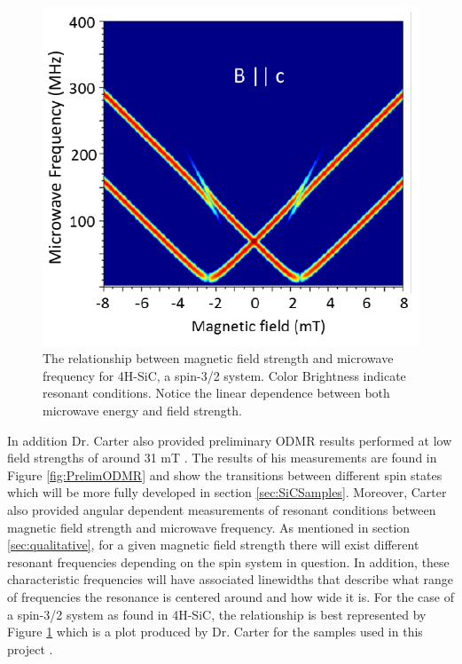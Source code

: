 \documentclass[oneside, noacknowlegments]{BYUPhys}
\begin{document}
\begin{figure}[h]
    \centerline{\includegraphics{MFRelationship_fig}}
    \caption[Magnetic Field and Microwave Frequency Relationship]{\label{fig:MFRelationship}
     The relationship between magnetic field strength and microwave frequency for 4H-SiC, a spin-3/2 system.  Color Brightness indicate resonant conditions. Notice the linear dependence between both microwave energy and field strength.}
 \end{figure}

In addition Dr. Carter also provided preliminary ODMR results performed at low field strengths of around 31 mT \cite{RefWorks:doc:5892964ee4b0499fa95c5108}. The results of his measurements are found in Figure \ref{fig:PrelimODMR} and show the transitions between different spin states which will be more fully developed in section \ref{sec:SiCSamples}. Moreover, Carter also provided angular dependent measurements of resonant conditions between magnetic field strength and microwave frequency. As mentioned in section \ref{sec:qualitative}, for a given magnetic field strength there will exist different resonant frequencies depending on the spin system in question. In addition, these characteristic frequencies will have associated linewidths that describe what range of frequencies the resonance is centered around and how wide it is. For the case of a spin-3/2 system as found in 4H-SiC, the relationship is best represented by Figure \ref{fig:MFRelationship} which is a plot produced by Dr. Carter for the samples used in this project \cite{RefWorks:doc:5892964ee4b0499fa95c5108}.
 
\end{document}
